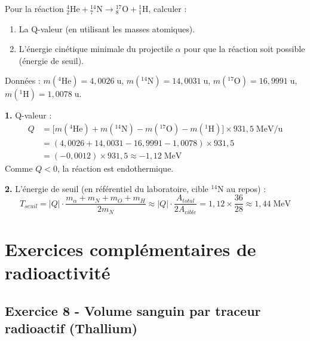 \documentclass[12pt,a4paper]{article}
\begin{document}
\begin{boiteexercice}
Pour la réaction ${}^4_2\text{He} + {}^{14}_7\text{N} \to {}^{17}_8\text{O} + {}^1_1\text{H}$, calculer :
\begin{enumerate}
  \item La Q-valeur (en utilisant les masses atomiques).
  \item L'énergie cinétique minimale du projectile $\alpha$ pour que la réaction soit possible (énergie de seuil).
\end{enumerate}
Données : $m({}^4\text{He}) = 4{,}0026\;\text{u}$, $m({}^{14}\text{N}) = 14{,}0031\;\text{u}$, $m({}^{17}\text{O}) = 16{,}9991\;\text{u}$, $m({}^1\text{H}) = 1{,}0078\;\text{u}$.
\end{boiteexercice}

\begin{boitecorrige}
\textbf{1.} Q-valeur :
\begin{align*}
Q &= \bigl[m({}^4\text{He}) + m({}^{14}\text{N}) - m({}^{17}\text{O}) - m({}^1\text{H})\bigr]\times931{,}5\;\text{MeV/u} \\
&= (4{,}0026 + 14{,}0031 - 16{,}9991 - 1{,}0078)\times931{,}5 \\
&= (-0{,}0012)\times931{,}5 \approx -1{,}12\;\text{MeV}
\end{align*}
Comme $Q < 0$, la réaction est endothermique.

\textbf{2.} L'énergie de seuil (en référentiel du laboratoire, cible ${}^{14}$N au repos) :
\[
T_{seuil} = |Q|\cdot\frac{m_\alpha + m_N + m_O + m_H}{2m_N} \approx |Q|\cdot\frac{A_{total}}{2A_{cible}} = 1{,}12\times\frac{36}{28} \approx 1{,}44\;\text{MeV}
\]
\end{boitecorrige}


\newpage
\section{Exercices complémentaires de radioactivité}

\subsection*{Exercice 8 - Volume sanguin par traceur radioactif (Thallium) \niveau{\moyen}}
\end{document}
